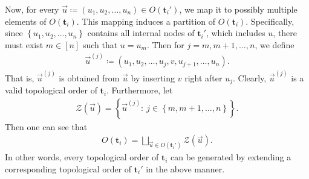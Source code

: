 \documentclass[superscriptaddress,onecolumn,nofootinbib,longbibliography,a4paper,accepted=2026-09-29]{quantumarticle}
\theoremstyle{plain}
\theoremstyle{definition}
\numberwithin{thm}{section}
\numberwithin{assumption}{section}
\numberwithin{lemma}{section}
\numberwithin{prop}{section}
\numberwithin{cor}{section}
\numberwithin{definition}{section}
\numberwithin{rmk}{section}
\numberwithin{equation}{section}
\newcommand{\lrcb}[1]{\left \{ #1 \right \}}
\newcommand{\defeq}{\coloneqq}
\newcommand{\mbt}{\mathbf{t}}
\begin{document}
\begin{itemize}
Now, for every $\vec u \defeq (u_1, u_2, \dots, u_n) \in O(\mbt_i')$, 
we map it to possibly multiple elements of $O(\mbt_i)$. This mapping induces a partition of $O(\mbt_i)$. Specifically, since $\lrcb{u_1, u_2, \dots, u_n}$ contains all internal nodes of $\mbt_i'$, which includes $u$, there must exist $m \in [n]$ such that $u=u_m$. Then for $j=m, m+1, \dots, n$, we define
\begin{align}
    \vec u^{(j)} \defeq (u_1, u_2, \dots, u_j, v, u_{j+1}, \dots, u_{n}).
\end{align}
That is, $\vec u^{(j)}$ is obtained from $\vec u$ by inserting $v$ right after $u_j$. Clearly, $\vec u^{(j)}$ is a valid topological order of $\mbt_i$. Furthermore, let
\begin{align}
    \mathcal{Z}(\vec u) = \lrcb{\vec u^{(j)}:~j\in \lrcb{m, m+1, \dots, n}}.
\end{align}
Then one can see that
\begin{align}
    O(\mbt_i) = \bigsqcup_{\vec u \in O(\mbt_i')} \mathcal{Z}(\vec u).
    \label{eq:Oti_partition}
\end{align}
In other words, every topological order of $\mbt_i$ can be generated by extending a corresponding topological order of $\mbt_i'$ in the above manner.


\end{itemize}
\end{document}
